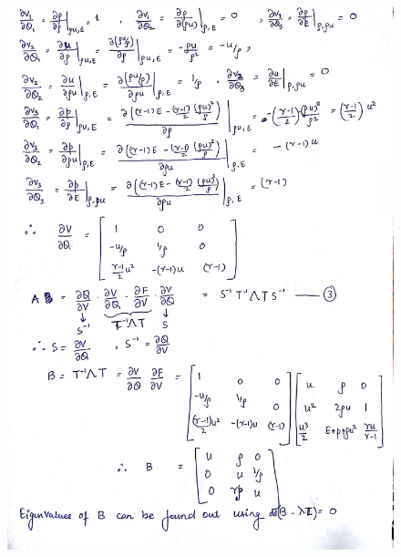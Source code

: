 \documentclass{article}
\begin{document}
\begin{figure}[H]   \label{figure}
\includegraphics[width=15cm]{three.jpg}
\label{figure:}
\end{figure}
\newpage
\end{document}
